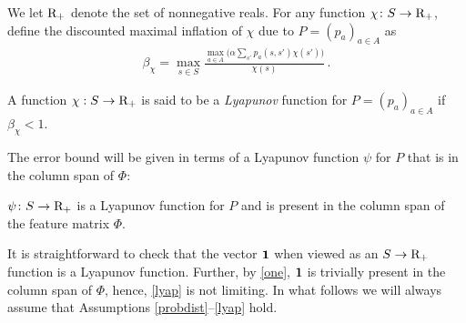 We let $\mathrm{R}_+$ denote the set of nonnegative reals. 
For any function $\chi\colon S\rightarrow \mathrm{R}_+$, define the discounted maximal inflation of $\chi$ due to $P = (p_a)_{a\in A}$ as
\begin{align*}
\beta_{\chi}=\max_{s \in S} \frac{\underset{a \in A}{\max}\big(\alpha\sum_{s'}p_a(s,s')\chi(s')\big)}{\chi(s)}\,.
\end{align*}
\begin{definition}
A function $\chi:S\to\mathrm{R}_+$ is said to be a \emph{Lyapunov} function for $P = (p_a)_{a\in A}$ 
	if $\beta_{\chi}<1$.
\end{definition}
The error bound will be given in terms of a Lyapunov function $\psi$ for $P$ that is in the column span of $\Phi$:
\begin{assumption}\label{lyap}
$\psi\colon S \rightarrow \mathrm{R}_+$ is a Lyapunov function for $P$
and is present in the column span of the feature matrix $\Phi$.
\end{assumption}
It is straightforward to check that the vector $\mathbf{1}$ when viewed as an $S \to \mathrm{R}_+$ function 
is a Lyapunov function. 
Further, by \cref{one}, $\mathbf{1}$ is trivially present in the column span of $\Phi$, 
hence, \cref{lyap} is not limiting.
In what follows we will always assume that Assumptions \ref{probdist}--\ref{lyap} hold. 

